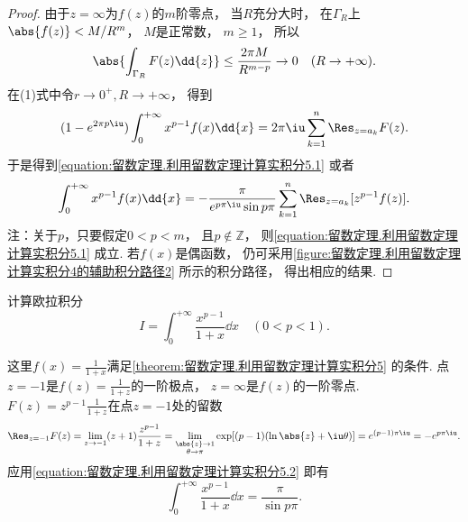 \begin{theorem}
\begin{proof}
由于\(z=\infty\)为\(f(z)\)的\(m\)阶零点，
当\(R\)充分大时，
在\(\Gamma_R\)上\(\abs{f(z)}<M/R^m\)，
\(M\)是正常数，
\(m\geq1\)，
所以\[
	\abs{\int_{\Gamma_R} F(z) \dd{z}}
	\leq \frac{2\pi M}{R^{m-p}} \to0\quad(R\to+\infty).
\]
在(1)式中令\(r\to0^+,R\to+\infty\)，
得到\[
	(1-e^{2\pi p\iu}) \int_0^{+\infty} x^{p-1} f(x) \dd{x}
	= 2\pi\iu \sum_{k=1}^n \Res_{z=a_k} F(z).
\]
于是得到\cref{equation:留数定理.利用留数定理计算实积分5.1}
或者\begin{equation}\label{equation:留数定理.利用留数定理计算实积分5.2}
	\int_0^{+\infty} x^{p-1} f(x) \dd{x}
	= -\frac{\pi}{e^{p\pi\iu} \sin p\pi} \sum_{k=1}^n \Res_{z=a_k}[z^{p-1} f(z)].
\end{equation}
注：关于\(p\)，只要假定\(0<p<m\)，
且\(p\notin\mathbb{Z}\)，
则\cref{equation:留数定理.利用留数定理计算实积分5.1} 成立.
若\(f(x)\)是偶函数，
仍可采用\cref{figure:留数定理.利用留数定理计算实积分4的辅助积分路径2} 所示的积分路径，
得出相应的结果.
\end{proof}
\end{theorem}

\begin{example}
计算欧拉积分\[
	I = \int_0^{+\infty} \frac{x^{p-1}}{1+x} \dd{x} \quad(0<p<1).
\]
\begin{solution}
这里\(f(x) = \frac{1}{1+x}\)满足\cref{theorem:留数定理.利用留数定理计算实积分5} 的条件.
点\(z=-1\)是\(f(z) = \frac{1}{1+z}\)的一阶极点，
\(z=\infty\)是\(f(z)\)的一阶零点.
\(F(z) = z^{p-1} \frac{1}{1+z}\)在点\(z=-1\)处的留数\[
	\Res_{z=-1} F(z)
	= \lim_{z\to-1} (z+1) \frac{z^{p-1}}{1+z}
	= \lim_{\substack{\abs{z}\to1 \\ \theta\to\pi}} \exp[(p-1)(\ln\abs{z}+\iu\theta)]
	= e^{(p-1)\pi\iu}
	= -e^{p\pi\iu}.
\]
应用\cref{equation:留数定理.利用留数定理计算实积分5.2}
即有\begin{equation}
	\int_0^{+\infty} \frac{x^{p-1}}{1+x} \dd{x} = \frac{\pi}{\sin p\pi}.
\end{equation}
\end{solution}
\end{example}

